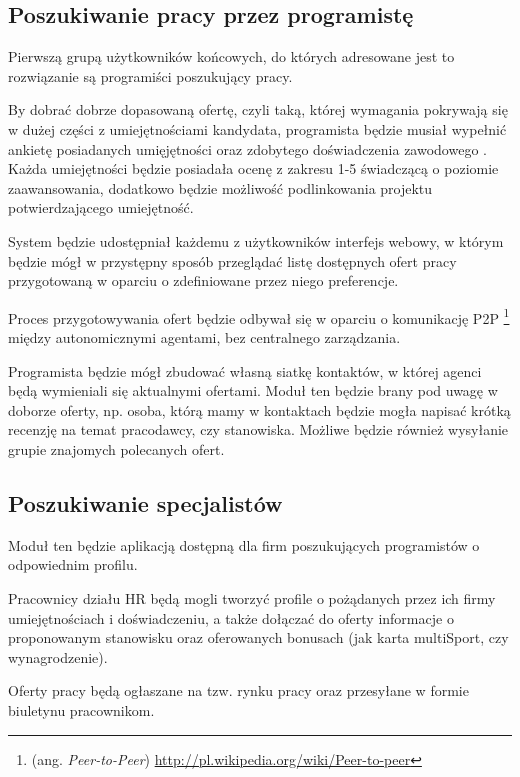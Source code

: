 \documentclass[11pt,a4paper]{article}
\begin{document}
\subsection{Poszukiwanie pracy przez programistę}
Pierwszą grupą użytkowników końcowych, do których adresowane jest to rozwiązanie są programiści poszukujący pracy.

By dobrać dobrze dopasowaną ofertę, czyli taką, której wymagania pokrywają się w dużej części z umiejętnościami kandydata, programista będzie musiał wypełnić ankietę posiadanych umięjętności oraz zdobytego doświadczenia zawodowego . Każda umiejętności będzie posiadała ocenę z zakresu 1-5 świadczącą o poziomie zaawansowania, dodatkowo będzie możliwość podlinkowania projektu potwierdzającego umiejętność.

System będzie udostępniał każdemu z użytkowników interfejs webowy, w którym będzie mógł w przystępny sposób przeglądać listę dostępnych ofert pracy przygotowaną w oparciu o zdefiniowane przez niego preferencje.

Proces przygotowywania ofert będzie odbywał się w oparciu o komunikację P2P \footnote{(ang. \emph{Peer-to-Peer}) \url{http://pl.wikipedia.org/wiki/Peer-to-peer}} między autonomicznymi agentami, bez centralnego zarządzania.

Programista będzie mógł zbudować własną siatkę kontaktów, w której agenci będą wymieniali się aktualnymi ofertami. Moduł ten będzie brany pod uwagę w doborze oferty, np. osoba, którą mamy w kontaktach będzie mogła napisać krótką recenzję na temat pracodawcy, czy stanowiska. Możliwe będzie również wysyłanie grupie znajomych polecanych ofert.


\subsection{Poszukiwanie specjalistów}
Moduł ten będzie aplikacją dostępną dla firm poszukujących programistów o odpowiednim profilu.

Pracownicy działu HR będą mogli tworzyć profile o pożądanych przez ich firmy umiejętnościach i doświadczeniu, a także dołączać do oferty informacje o proponowanym stanowisku oraz oferowanych bonusach (jak karta multiSport, czy wynagrodzenie).

Oferty pracy będą ogłaszane na tzw. rynku pracy  oraz przesyłane w formie biuletynu pracownikom.
\end{document}
